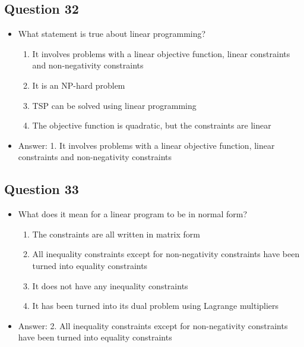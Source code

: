 \begin{slide}
\section[-1]{Question 32}

\begin{PauseHighLight}
  \begin{itemize}
  \item What statement is true about linear programming?
    \begin{enumerate}
    \item It involves problems with a linear objective function, linear constraints and non-negativity constraints
    \item It is an NP-hard problem
    \item TSP can be solved using linear programming
    \item The objective function is quadratic, but the constraints are linear\pause
    \end{enumerate}
  \item Answer: 1. It involves problems with a linear objective function, linear constraints and non-negativity constraints\pauseb
  \end{itemize}
\end{PauseHighLight}
\end{slide}

\begin{slide}
\section[-1]{Question 33}

\begin{PauseHighLight}
  \begin{itemize}
  \item What does it mean for a linear program to be in normal form?
    \begin{enumerate}
    \item The constraints are all written in matrix form
    \item All inequality constraints except for non-negativity constraints have been turned into equality constraints
    \item It does not have any inequality constraints
    \item It has been turned into its dual problem using Lagrange multipliers\pause
    \end{enumerate}
  \item Answer: 2. All inequality constraints except for non-negativity constraints have been turned into equality constraints\pauseb
  \end{itemize}
\end{PauseHighLight}
\end{slide}

